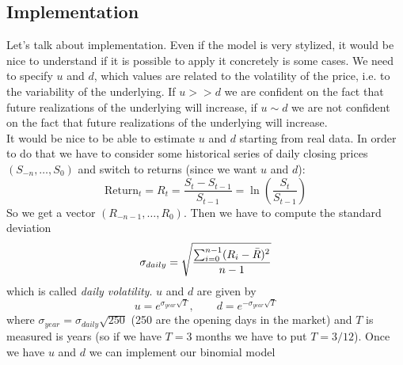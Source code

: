 \subsection{Implementation}\label{sec:impl}
Let's talk about implementation. Even if the model is very stylized, it would be nice to understand if it is possible to apply it concretely is some cases. We need to specify $u$ and $d$, which values are related to the volatility of the price, i.e. to the variability of the underlying. If $u>>d$ we are confident on the fact that future realizations of the underlying will increase, if $u\sim d$ we are not confident on the fact that future realizations of the underlying will increase. \\
It would be nice to be able to estimate $u$ and $d$ starting from real data. In order to do that we have to consider some historical series of daily closing prices $(S_{-n},\dots,S_0)$ and switch to returns (since we want $u$ and $d$):
\begin{equation}
    \mbox{Return}_t = R_t = \dfrac{S_t-S_{t-1}}{S_{t-1}} = \ln\left(\dfrac{S_t}{S_{t-1}}\right)
\end{equation}
So we get a vector $(R_{-n-1},\dots,R_0)$. Then we have to compute the standard deviation
\begin{equation}
    \sigma_{daily} = \sqrt{\dfrac{\sum^{n-1}_{i=0}(R_i-\Bar{R})^2}{n-1}}
\end{equation}
which is called \emph{daily volatility}. $u$ and $d$ are given by
\begin{equation}
    u = e^{\sigma_{year}\sqrt{T}}, \qquad d = e^{-\sigma_{year}\sqrt{T}}
\end{equation}
where $\sigma_{year} = \sigma_{daily}\sqrt{250}$ (250 are the opening days in the market) and $T$ is measured is years (so if we have $T=3$ months we have to put $T=3/12$). Once we have $u$ and $d$ we can implement our binomial model
